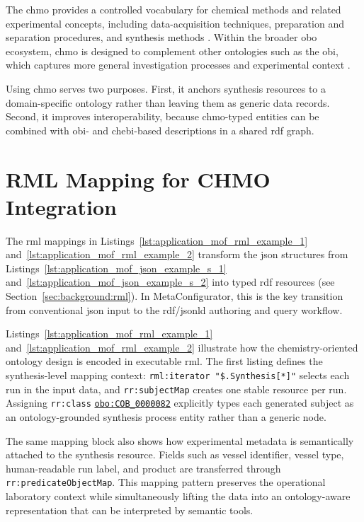 The \gls{chmo} provides a controlled vocabulary for chemical methods and related experimental concepts, including data-acquisition techniques, preparation and separation procedures, and synthesis methods \cite{chmo_ontology}. Within the broader \gls{obo} ecosystem, \gls{chmo} is designed to complement other ontologies such as the \gls{obi}, which captures more general investigation processes and experimental context \cite{obi2016,jackson2021obofoundry}.

Using \gls{chmo} serves two purposes. First, it anchors synthesis resources to a domain-specific ontology rather than leaving them as generic data records. Second, it improves interoperability, because \gls{chmo}-typed entities can be combined with \gls{obi}- and \gls{chebi}-based descriptions in a shared \gls{rdf} graph.

\section{RML Mapping for CHMO Integration}\label{sec:application:metal:rml}

The \gls{rml} mappings in Listings~\ref{lst:application_mof_rml_example_1} and~\ref{lst:application_mof_rml_example_2} transform the \gls{json} structures from Listings~\ref{lst:application_mof_json_example_s_1} and~\ref{lst:application_mof_json_example_s_2} into typed \gls{rdf} resources (see Section~\ref{sec:background:rml}). In MetaConfigurator, this is the key transition from conventional \gls{json} input to the \gls{rdf}/\gls{jsonld} authoring and query workflow.

Listings~\ref{lst:application_mof_rml_example_1} and~\ref{lst:application_mof_rml_example_2} illustrate how the chemistry-oriented ontology design is encoded in executable \gls{rml}. The first listing defines the synthesis-level mapping context: \texttt{rml:iterator "\$.Synthesis[*]"} selects each run in the input data, and \texttt{rr:subjectMap} creates one stable resource per run. Assigning \texttt{rr:class} \href{http://purl.obolibrary.org/obo/COB_0000082}{\texttt{obo:COB\_0000082}} explicitly types each generated subject as an ontology-grounded synthesis process entity rather than a generic node.

The same mapping block also shows how experimental metadata is semantically attached to the synthesis resource. Fields such as vessel identifier, vessel type, human-readable run label, and product are transferred through \texttt{rr:predicateObjectMap}. This mapping pattern preserves the operational laboratory context while simultaneously lifting the data into an ontology-aware representation that can be interpreted by semantic tools.

